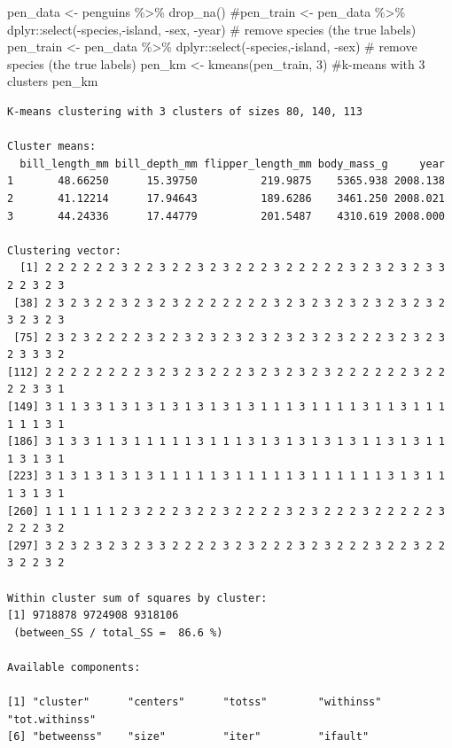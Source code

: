 \documentclass[
  letterpaper,
  DIV=11,
  numbers=noendperiod]{scrreprt}
\newenvironment{Shaded}{\begin{snugshade}}{\end{snugshade}}
\newcommand{\CommentTok}[1]{\textcolor[rgb]{0.37,0.37,0.37}{#1}}
\newcommand{\DecValTok}[1]{\textcolor[rgb]{0.68,0.00,0.00}{#1}}
\newcommand{\FunctionTok}[1]{\textcolor[rgb]{0.28,0.35,0.67}{#1}}
\newcommand{\NormalTok}[1]{\textcolor[rgb]{0.00,0.23,0.31}{#1}}
\newcommand{\OtherTok}[1]{\textcolor[rgb]{0.00,0.23,0.31}{#1}}
\newcommand{\SpecialCharTok}[1]{\textcolor[rgb]{0.37,0.37,0.37}{#1}}
\begin{document}
\begin{Shaded}
\begin{Highlighting}[]
\NormalTok{pen\_data }\OtherTok{\textless{}{-}}\NormalTok{ penguins }\SpecialCharTok{\%\textgreater{}\%} \FunctionTok{drop\_na}\NormalTok{() }
\CommentTok{\#pen\_train \textless{}{-} pen\_data  \%\textgreater{}\% dplyr::select({-}species,{-}island, {-}sex, {-}year) \# remove species (the true labels)}
\NormalTok{pen\_train }\OtherTok{\textless{}{-}}\NormalTok{ pen\_data  }\SpecialCharTok{\%\textgreater{}\%}\NormalTok{ dplyr}\SpecialCharTok{::}\FunctionTok{select}\NormalTok{(}\SpecialCharTok{{-}}\NormalTok{species,}\SpecialCharTok{{-}}\NormalTok{island, }\SpecialCharTok{{-}}\NormalTok{sex) }\CommentTok{\# remove species (the true labels)}
\NormalTok{pen\_km }\OtherTok{\textless{}{-}} \FunctionTok{kmeans}\NormalTok{(pen\_train, }\DecValTok{3}\NormalTok{) }\CommentTok{\#k{-}means with 3 clusters}
\NormalTok{pen\_km}
\end{Highlighting}
\end{Shaded}

\begin{verbatim}
K-means clustering with 3 clusters of sizes 80, 140, 113

Cluster means:
  bill_length_mm bill_depth_mm flipper_length_mm body_mass_g     year
1       48.66250      15.39750          219.9875    5365.938 2008.138
2       41.12214      17.94643          189.6286    3461.250 2008.021
3       44.24336      17.44779          201.5487    4310.619 2008.000

Clustering vector:
  [1] 2 2 2 2 2 2 3 2 2 3 2 2 3 2 3 2 2 2 3 2 2 2 2 2 3 2 3 2 3 2 3 3 2 2 3 2 3
 [38] 2 3 2 3 2 2 3 2 3 2 3 2 2 2 2 2 2 2 3 2 3 2 3 2 3 2 3 2 3 2 3 2 3 2 3 2 3
 [75] 2 3 2 3 2 2 2 2 3 2 2 3 2 3 2 3 2 3 2 3 2 3 2 3 2 2 2 3 2 3 2 3 2 3 3 3 2
[112] 2 2 2 2 2 2 2 2 3 2 3 2 3 2 2 2 3 2 3 2 3 2 3 2 2 2 2 2 2 3 2 2 2 2 3 3 1
[149] 3 1 1 3 3 1 3 1 3 1 3 1 3 1 3 1 3 1 1 1 3 1 1 1 1 3 1 1 3 1 1 1 1 1 1 3 1
[186] 3 1 3 3 1 1 3 1 1 1 1 1 3 1 1 1 3 1 3 1 3 1 3 1 3 1 1 3 1 3 1 1 1 3 1 3 1
[223] 3 1 3 1 3 1 3 1 3 1 1 1 1 1 3 1 1 1 1 1 3 1 1 1 1 1 1 3 1 3 1 1 1 3 1 3 1
[260] 1 1 1 1 1 1 2 3 2 2 2 3 2 2 3 2 2 2 2 3 2 3 2 2 2 3 2 2 2 2 2 3 2 2 2 3 2
[297] 3 2 3 2 3 2 3 2 3 3 2 2 2 2 3 2 3 2 2 2 3 2 3 2 2 2 3 2 2 3 2 2 3 2 2 3 2

Within cluster sum of squares by cluster:
[1] 9718878 9724908 9318106
 (between_SS / total_SS =  86.6 %)

Available components:

[1] "cluster"      "centers"      "totss"        "withinss"     "tot.withinss"
[6] "betweenss"    "size"         "iter"         "ifault"      
\end{verbatim}
\end{document}
